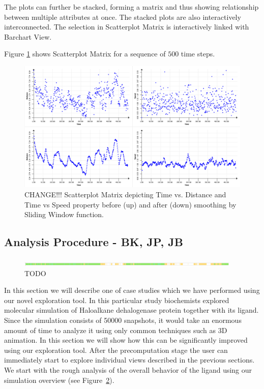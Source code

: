\documentclass[twocolumn]{bmcart}%
\begin{document}
The plots can further be stacked, forming a matrix and thus showing relationship between multiple attributes at once.
The stacked plots are also interactively interconnected.
The selection in Scatterplot Matrix is interactively linked with Barchart View.

Figure \ref{fig:scatterplot} shows Scatterplot Matrix for a sequence of $500$ time steps.

\begin{figure}[htb]
	\centering
  \includegraphics[width=0.95\linewidth]{img/scatterplot.png}
  \caption{\label{fig:scatterplot} CHANGE!!! Scatterplot Matrix depicting Time vs. Distance and Time vs Speed property before (up) and after (down) smoothing by Sliding Window function.}
\end{figure}

\subsection*{Analysis Procedure - BK, JP, JB}

\begin{figure}[htb]
	\centering
  \includegraphics[width=0.95\textwidth]{img/case_overview.png}
  \caption{\label{fig:case_overview} {\color{red}TODO}}
\end{figure}

In this section we will describe one of case studies which we have performed using our novel exploration tool.
In this particular study biochemists explored molecular simulation of Haloalkane dehalogenase protein together with its ligand. 
Since the simulation consists of 50000 snapshots, it would take an enormous amount of time to analyze it using only common techniques such as 3D animation.
In this section we will show how this can be significantly improved using our exploration tool.
After the precomputation stage the user can immediately start to explore individual views described in the previous sections.
We start with the rough analysis of the overall behavior of the ligand using our simulation overview (see Figure~\ref{fig:case_overview}).
\end{document}
